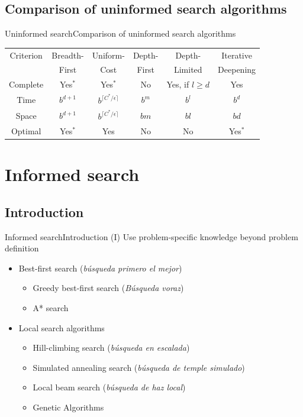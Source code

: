 \documentclass[10pt,compress]{beamer} %
\begin{document}
\subsection{Comparison of uninformed search algorithms}

\begin{frame}{Uninformed search}{Comparison of uninformed search algorithms}

\begin{tabular}{cccccc}
\hline
Criterion & Breadth- & Uniform- & Depth- & Depth- & Iterative \\
          & First &  Cost & First & Limited & Deepening \\
\hline
Complete  & Yes$^*$ & Yes$^*$ & No & Yes, if $l \ge d$ & Yes \\
Time      & $b^{d+1}$ & $b^{\lceil C^*/\epsilon \rceil}$ & $b^m$ & $b^l$ & $b^d$ \\
Space     & $b^{d+1}$ & $b^{\lceil C^*/\epsilon \rceil}$ & $bm$ & $bl$ & $bd$ \\
Optimal   & Yes$^*$ & Yes & No & No & Yes$^*$ \\
\hline
\end{tabular}

\end{frame}


\section{Informed search}
\subsection{Introduction}

\begin{frame}{Informed search}{Introduction (I)}
    Use problem-specific knowledge beyond problem definition
      \begin{itemize}
        \item Best-first search (\textit{búsqueda primero el mejor})
            \begin{itemize}
                \item Greedy best-first search (\textit{Búsqueda voraz})
                \item A* search
            \end{itemize}
        \item Local search algorithms
            \begin{itemize}
            \item Hill-climbing search (\textit{búsqueda en escalada})
            \item Simulated annealing search (\textit{búsqueda de temple simulado})
            \item Local beam search (\textit{búsqueda de haz local})
            \item Genetic Algorithms 
        \end{itemize}
      \end{itemize}
\end{frame}
\end{document}
